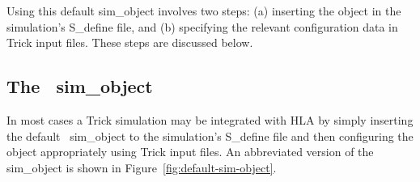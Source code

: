 Using this default {\ttfamily sim\_object} involves two steps:
(a) inserting the object in the simulation's {\ttfamily S\_define} file, and
(b) specifying the relevant configuration data in Trick input files.
These steps are discussed below.

\subsection{The \TrickHLA\ {\ttfamily sim\_object}}

In most cases a Trick simulation may be integrated with HLA by simply
inserting the default \TrickHLA\ {\ttfamily sim\_object} to the simulation's
{\ttfamily S\_define} file and then configuring the object appropriately
using Trick input files.
An abbreviated version of the {\ttfamily sim\_object} is shown in
Figure~\ref{fig:default-sim-object}.

